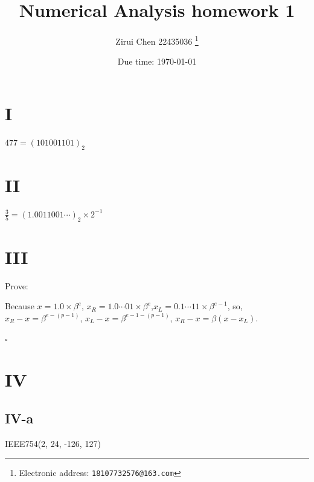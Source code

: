 \documentclass[a4paper]{article}
\begin{document}
\title{Numerical Analysis homework 1}

\author{Zirui Chen 22435036
  \thanks{Electronic address: \texttt{18107732576@163.com}}}


\date{Due time: \today}

\maketitle






\section*{I}

$477 = (101001101)_{2}$


\section*{II}
$\frac{3}{5} = (1.0011001\cdots)_{2} \times 2^{-1}$


\section*{III}

Prove:

Because $x = 1.0\times \beta ^{e}$, $x_{R} = 1.0\cdots 01\times \beta ^{e}$,$x_{L} = 0.1\cdots 11\times \beta ^{e-1}$,
so, $x_{R} - x = \beta ^{e-(p-1)}$, $x_{L} - x = \beta ^{e-1-(p-1)}$, $x_{R} - x = \beta(x - x_{L})$.

\begin{flushright} %
    $\square$ 
\end{flushright} 

\section*{IV}

\subsection*{IV-a}
IEEE754(2, 24, -126, 127)
\end{document}
